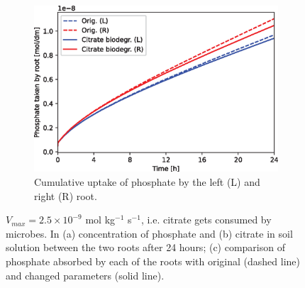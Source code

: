 \documentclass[11pt]{article}
\numberwithin{equation}{section}
\begin{document}
\begin{figure}[!htb]
\begin{subfigure}[t]{0.45\textwidth}
    \includegraphics[width=\textwidth]{Figures/citratevmaxnonzero.eps}
    \caption{Cumulative uptake of phosphate by the left (L) and right (R) root.}
    \label{fig:numexp_vmax2}
\end{subfigure}
\caption{$V_{max} = 2.5 \times 10^{-9}$ mol kg$^{-1}$ s$^{-1}$, i.e. citrate gets consumed by microbes. In (a) concentration of phosphate and (b) citrate in soil solution between the two roots after 24 hours; (c) comparison of phosphate absorbed by each of the roots with original (dashed line) and changed parameters (solid line).}
\end{figure}







\end{document}
